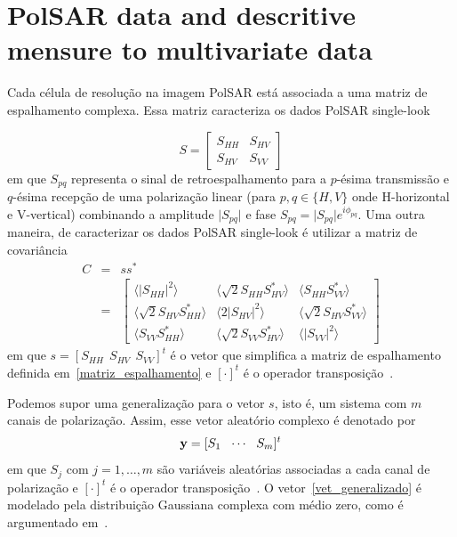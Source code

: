 \documentclass[journal]{IEEEtran}
\begin{document}
\section{PolSAR data and descritive mensure to multivariate data}\label{dois}


Cada célula de resolução na imagem PolSAR está associada a uma matriz de espalhamento complexa. Essa matriz caracteriza os dados PolSAR single-look

\begin{equation}\label{matriz_espalhamento}
S =\begin{bmatrix}
S_{HH} & S_{HV}\\
S_{HV} & S_{VV}  
\end{bmatrix}
\end{equation}
em que $S_{pq}$ representa o sinal de retroespalhamento para a $p$-ésima transmissão e $q$-ésima recepção de uma polarização linear (para $p,q\in \{H,V\}$ onde H-horizontal e V-vertical) combinando a amplitude $\vert S_{pq}\vert$ e fase $S_{pq}=\vert S_{pq}\vert e^{i\phi_{pq}}$. Uma outra maneira, de caracterizar os dados PolSAR single-look é utilizar a matriz de covariância 
{\scriptsize
\begin{eqnarray}\label{matriz_covariancia}
C &=& ss^{*} \nonumber \\
  &=&\begin{bmatrix}
\langle \vert S_{HH}\vert^2\rangle & \langle \sqrt{2}S_{HH}S^{*}_{HV}\rangle & \langle S_{HH}S^{*}_{VV}\rangle\\
\langle \sqrt{2}S_{HV}S^{*}_{HH}\rangle & \langle 2\vert S_{HV}\vert^2\rangle & \langle \sqrt{2}S_{HV}S^{*}_{VV}\rangle\\
\langle S_{VV}S^{*}_{HH}\rangle & \langle \sqrt{2}S_{VV}S^{*}_{HV}\rangle & \langle \vert S_{VV}\vert^2\rangle  
\end{bmatrix}
\end{eqnarray}}
em que $s=[S_{HH}\ \ S_{HV}\ \ S_{VV}]^{t}$ é o vetor que simplifica a matriz de espalhamento definida em~\ref{matriz_espalhamento} e $[\cdot]^{t}$ é o operador transposição~\cite{Lee-2009,ma-2015}. 

Podemos supor uma generalização para o vetor $s$, isto é, um sistema com $m$ canais de polarização. Assim, esse vetor aleatório complexo é denotado por
\begin{equation}
{\bf y}=[S_{1}\ \ \cdots \ \ S_{m}]^{t}\label{vet_generalizado}
\end{equation}
em que $S_{j}$ com $j=1,\dots,m$ são variáveis aleatórias associadas a cada canal de polarização e $[\cdot]^{t}$ é o operador transposição~\cite{Frery-2014}. O vetor~\ref{vet_generalizado} é modelado pela distribuição Gaussiana complexa com médio zero, como é argumentado em~\cite{Goodman-1963}. 
\end{document}
